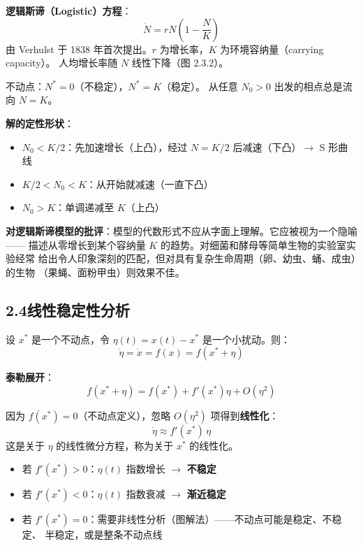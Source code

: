 \documentclass[12pt,a4paper]{article}
\begin{document}
\textbf{逻辑斯谛（Logistic）方程}：
\begin{equation}
\dot{N} = rN\left(1 - \frac{N}{K}\right)
\end{equation}
由 Verhulst 于 1838 年首次提出。$r$ 为增长率，$K$ 为环境容纳量（carrying capacity）。
人均增长率随 $N$ 线性下降（图 2.3.2）。

不动点：$N^* = 0$（不稳定），$N^* = K$（稳定）。
从任意 $N_0 > 0$ 出发的相点总是流向 $N = K$。

\textbf{解的定性形状}：
\begin{itemize}[nosep]
  \item $N_0 < K/2$：先加速增长（上凸），经过 $N = K/2$ 后减速（下凸）$\to$ S 形曲线
  \item $K/2 < N_0 < K$：从开始就减速（一直下凸）
  \item $N_0 > K$：单调递减至 $K$（上凸）
\end{itemize}

\textbf{对逻辑斯谛模型的批评}：模型的代数形式不应从字面上理解。它应被视为一个隐喻——
描述从零增长到某个容纳量 $K$ 的趋势。对细菌和酵母等简单生物的实验室实验经常
给出令人印象深刻的匹配，但对具有复杂生命周期（卵、幼虫、蛹、成虫）的生物
（果蝇、面粉甲虫）则效果不佳。

\subsection{2.4\quad 线性稳定性分析}

设 $x^*$ 是一个不动点，令 $\eta(t) = x(t) - x^*$ 是一个小扰动。则：
\begin{equation}
\dot{\eta} = \dot{x} = f(x) = f(x^* + \eta)
\end{equation}

\textbf{泰勒展开}：
\begin{equation}
f(x^* + \eta) = f(x^*) + f'(x^*)\eta + O(\eta^2)
\end{equation}

因为 $f(x^*) = 0$（不动点定义），忽略 $O(\eta^2)$ 项得到\textbf{线性化}：
\begin{equation}\label{eq:linearization}
\dot{\eta} \approx f'(x^*)\,\eta
\end{equation}
这是关于 $\eta$ 的线性微分方程，称为关于 $x^*$ 的线性化。
\begin{itemize}[nosep]
  \item 若 $f'(x^*) > 0$：$\eta(t)$ 指数增长 $\to$ \textbf{不稳定}
  \item 若 $f'(x^*) < 0$：$\eta(t)$ 指数衰减 $\to$ \textbf{渐近稳定}
  \item 若 $f'(x^*) = 0$：需要非线性分析（图解法）——不动点可能是稳定、不稳定、
        半稳定，或是整条不动点线
\end{itemize}
\end{document}
